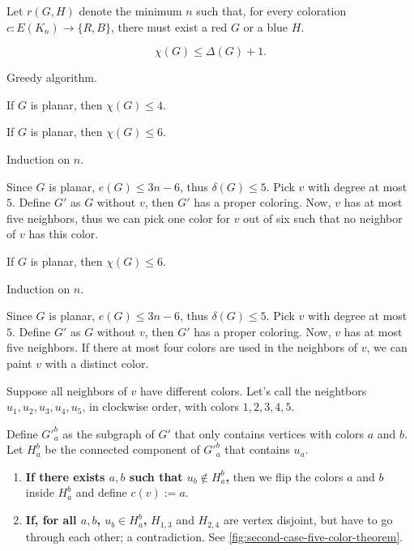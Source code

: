 \begin{defn}
	Let $r(G, H)$ denote the minimum $n$ such that, for every coloration $c \colon E(K_n) \to \{R, B\}$, there must exist a red $G$ or a blue $H$.
\end{defn}

\begin{prop}
	\[
		\chi(G) \le \Delta(G) + 1.
	\]
\end{prop}

\begin{sk}
	Greedy algorithm.
\end{sk}

\begin{thm}
	If $G$ is planar, then $\chi(G) \le 4$.
\end{thm}

\begin{prop}
	If $G$ is planar, then $\chi(G) \le 6$.
\end{prop}

\begin{dem}
	Induction on $n$.

	Since $G$ is planar, $e(G) \le 3n - 6$, thus $\delta(G) \le 5$. Pick $v$ with degree at most $5$. 
	Define $G'$ as $G$ without $v$, then $G'$ has a proper coloring. Now, $v$ has at most five neighbors, thus we can pick one color for $v$ out of six such that no neighbor of $v$ has this color.
\end{dem}

\begin{thm}
	If $G$ is planar, then $\chi(G) \le 6$.
\end{thm}

\begin{dem}
	Induction on $n$.

	Since $G$ is planar, $e(G) \le 3n - 6$, thus $\delta(G) \le 5$. Pick $v$ with degree at most $5$. 
	Define $G'$ as $G$ without $v$, then $G'$ has a proper coloring. Now, $v$ has at most five neighbors. If there at most four colors are used in the neighbors of $v$, we can paint $v$ with a distinct color.

	Suppose all neighbors of $v$ have different colors. Let's call the neightbors $u_1, u_2, u_3, u_4, u_5$, in clockwise order, with colors $1, 2, 3, 4, 5$.

	Define $\left.G'\right._a^b$ as the subgraph of $G'$ that only contains vertices with colors $a$ and $b$. Let $H_a^b$ be the connected component of $\left.G'\right._a^b$ that contains $u_a$.
	\begin{enumerate}[label = \textbullet]
		\item \textbf{\boldmath If there exists $a, b$ such that $u_b \not\in H_a^b$,} then we flip the colors $a$ and $b$ inside $H_a^b$ and define $c(v) := a$.
		\item \textbf{\boldmath If, for all $a, b$, $u_b \in H_a^b$,} $H_{1, 3}$ and $H_{2, 4}$ are vertex disjoint, but have to go through each other; a contradiction. See \cref{fig:second-case-five-color-theorem}.
	\end{enumerate}
\end{dem}

